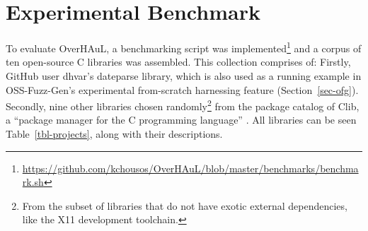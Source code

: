 \documentclass[
  a4paper,
]{scrreprt}
\theoremstyle{definition}
\theoremstyle{remark}
\begin{document}
\section{Experimental Benchmark}\label{sec-benchmark}

To evaluate OverHAuL, a benchmarking script was implemented\footnote{\url{https://github.com/kchousos/OverHAuL/blob/master/benchmarks/benchmark.sh}}
and a corpus of ten open-source C libraries was assembled. This
collection comprises of: Firstly, GitHub user dhvar's dateparse library,
which is also used as a running example in OSS-Fuzz-Gen's
\autocite{oss-fuzz-gen} experimental from-scratch harnessing feature
(Section~\ref{sec-ofg}). Secondly, nine other libraries chosen
randomly\footnote{From the subset of libraries that do not have exotic
  external dependencies, like the X11 development toolchain.} from the
package catalog of Clib, a ``package manager for the C programming
language'' \autocite{clibs,clib}. All libraries can be seen
Table~\ref{tbl-projects}, along with their descriptions.
\end{document}
